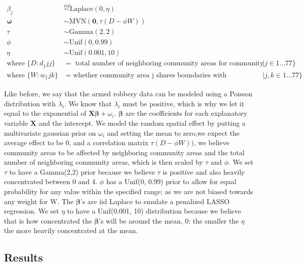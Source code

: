 \documentclass{article} %
\begin{document}
$$
\begin{aligned}
\beta_j &\overset{iid}{\sim} \text{Laplace}(0, \eta)\\
\boldsymbol{\omega} &\sim \text{MVN}(\mathbf{0}, \tau(D -\phi W))\\
\tau &\sim \text{Gamma}(2,2)\\
\phi &\sim \text{Unif}(0,0.99)\\
\eta &\sim \text{Unif}(0.001,10)\\
\text{where } \{D:d_\{jj\} &= \text{ total number of neighboring community areas for community area j}| j \in 1...77\} \\  
\text{where } \{W:w_\{jk\} &= \text{whether community area j shares boundaries with community area k}| j,k \in 1...77\}
\end{aligned}
$$

Like before, we say that the armed robbery data can be modeled using a Poisson distribution with $\lambda_i$. We know that $\lambda_i$ must be positive, which is why we let it equal to the exponential of $\mathbf{X}\boldsymbol{\beta} + \omega_i$. $\boldsymbol{\beta}$ are the coefficients for each explanatory variable $\mathbf{X}$ and the intercept. We model the random spatial effect by putting a multivariate gaussian prior on $\omega_i$ and setting the mean to zero,we expect the average effect to be 0, and a correlation matrix $\tau(D -\phi W))$, we believe community areas to be affected by neighboring community areas and the total number of neighboring community areas, which is then scaled by $\tau$ and $\phi$. We set $\tau$ to have a Gamma(2,2) prior because we believe $\tau$ is positive and also heavily concentrated between 0 and 4. $\phi$ has a Unif(0, 0.99) prior to allow for equal probability for any value within the specified range; as we are not biased towards any weight for W. The $\boldsymbol{\beta}$’s are iid Laplace to emulate a penalized LASSO regression. We set $\eta$ to have a Unif(0.001, 10) distribution because we believe that is how concentrated the $\boldsymbol{\beta}$'s will be around the mean, 0; the smaller the $\eta$ the more heavily concentrated at the mean. 



\subsection{Results}
\end{document}
